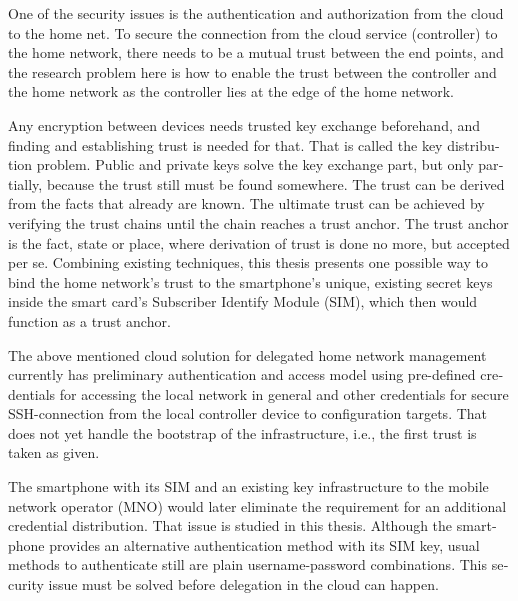 \documentclass[12pt,a4paper,english]{tutthesis}
\begin{document}
\begin{otherlanguage}{english}
One of the security issues is the authentication and authorization 
from the cloud to the home net.
To secure the connection from the cloud service (controller)
to the home network, there needs to be a mutual trust between the end
points, and the research problem here is how to enable the trust between the
controller and the home network as the controller lies at the edge of the
home network.



Any encryption between devices needs trusted key exchange beforehand,
and finding and establishing trust is needed for that.  That is called
the key distribution problem. Public and private keys solve the key exchange part, but
only partially, because the trust still must be found somewhere.
The trust can be derived from the facts that already are known.  
The ultimate trust can be achieved by verifying the trust chains 
until the chain reaches a trust anchor.
The trust anchor is the fact, state or place,
where derivation of trust is done no more, but accepted per se.
Combining existing techniques, this thesis presents one possible way
to bind the home network's trust to the smartphone's unique, existing
secret keys inside the smart card's Subscriber Identify Module (SIM),
which then would function as a trust anchor. 



The above mentioned cloud solution for delegated home network
management currently has preliminary authentication and access model
using pre-defined credentials for accessing the local network in general and other
credentials for secure SSH-connection from the local
controller device to configuration
targets\cite[Chap.4]{silverajan2015collaborative}.
That does not yet handle the bootstrap of the infrastructure, 
i.e., the first trust is taken as given. 

The smartphone with its SIM and an
existing key infrastructure to the mobile
network operator (MNO) would later eliminate the requirement for an
additional credential distribution. That issue is studied in this
thesis.  Although the smartphone provides an alternative authentication
method with its SIM key, usual methods to authenticate still are plain
username-password combinations.  This security issue must be solved
before delegation in the cloud can happen.












\end{otherlanguage}
\end{document}
